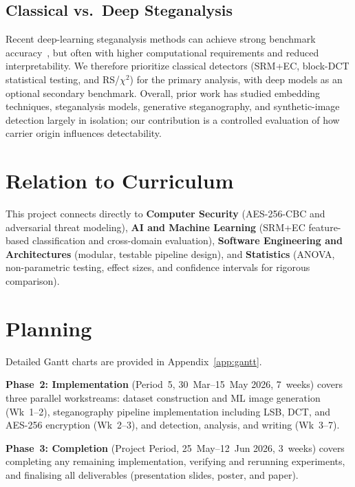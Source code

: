 \documentclass[10pt,twocolumn,a4paper]{article}
\begin{document}
\subsection{Classical vs.\ Deep Steganalysis}
Recent deep-learning steganalysis methods can achieve strong benchmark accuracy~\cite{luo2024survey,boroumand2019srnet}, but often with higher computational requirements and reduced interpretability. We therefore prioritize classical detectors (SRM+EC, block-DCT statistical testing, and RS/$\chi^2$) for the primary analysis, with deep models as an optional secondary benchmark. Overall, prior work has studied embedding techniques, steganalysis models, generative steganography, and synthetic-image detection largely in isolation; our contribution is a controlled evaluation of how carrier origin influences detectability.

\section{Relation to Curriculum}

This project connects directly to \textbf{Computer Security} (AES-256-CBC and adversarial threat modeling), \textbf{AI and Machine Learning} (SRM+EC feature-based classification and cross-domain evaluation), \textbf{Software Engineering and Architectures} (modular, testable pipeline design), and \textbf{Statistics} (ANOVA, non-parametric testing, effect sizes, and confidence intervals for rigorous comparison).

\section{Planning}

Detailed Gantt charts are provided in Appendix~\ref{app:gantt}.

\textbf{Phase~2: Implementation} (Period~5, 30~Mar--15~May 2026, 7~weeks) covers three parallel workstreams: dataset construction and ML image generation (Wk~1--2), steganography pipeline implementation including LSB, DCT, and AES-256 encryption (Wk~2--3), and detection, analysis, and writing (Wk~3--7).

\textbf{Phase~3: Completion} (Project Period, 25~May--12~Jun 2026, 3~weeks) covers completing any remaining implementation, verifying and rerunning experiments, and finalising all deliverables (presentation slides, poster, and paper).
\end{document}
